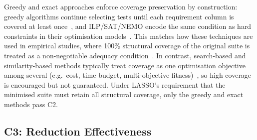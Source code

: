 \begin{appendices}
Greedy and exact approaches enforce coverage preservation by construction: greedy algorithms continue selecting tests until each requirement column is covered at least once~\cite{harrold1993,yoo2012,noemmer2020,jehan2023}, and ILP/SAT/NEMO encode the same condition as hard constraints in their optimisation models~\cite{elbaum2002,lin2018}. This matches how these techniques are used in empirical studies, where 100\% structural coverage of the original suite is treated as a non-negotiable adequacy condition~\cite{noemmer2020,jehan2023}. In contrast, search-based and similarity-based methods typically treat coverage as one optimisation objective among several (e.g.\ cost, time budget, multi-objective fitness)~\cite{yoo2012,khan2020,wei2017,bach2017}, so high coverage is encouraged but not guaranteed. Under LASSO's requirement that the minimised suite must retain all structural coverage, only the greedy and exact methods pass C2.

\subsection{C3: Reduction Effectiveness}\label{app:c3}


\end{appendices}
